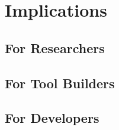 \section{Implications}
\subsection{For Researchers}
\subsection{For Tool Builders}
\subsection{For Developers}